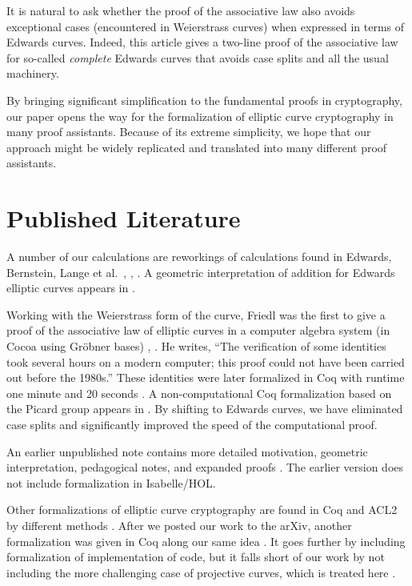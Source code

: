 \documentclass{llncs}
\begin{document}
It is natural to ask whether the proof of the associative law also
avoids exceptional cases (encountered in Weierstrass curves)
when expressed in terms of Edwards curves.
Indeed, this article gives a two-line proof of the associative law for
so-called \emph{complete} Edwards curves that avoids case splits and all
the usual machinery.

By bringing significant simplification to the fundamental proofs in
cryptography, our paper opens the way for the formalization of
elliptic curve cryptography in many proof assistants.  Because of its
extreme simplicity, we hope that our approach might be widely replicated
and translated into many different proof assistants.

\section{Published Literature}

A number of our calculations are reworkings of calculations found in
Edwards, Bernstein, Lange et al.~\cite{edwards2007normal},
\cite{bernstein2008twisted}, \cite{bernstein2007faster}.  A geometric
interpretation of addition for Edwards elliptic curves appears in
\cite{arene2011faster}.

Working with the Weierstrass form of the curve, Friedl was the first
to give a proof of the associative law of elliptic curves in a
computer algebra system (in Cocoa using Gr\"obner bases)
\cite{friedl}, \cite{friedl2017elementary}.  He writes, ``The
verification of some identities took several hours on a modern
computer; this proof could not have been carried out before the
1980s.''  These identities were later formalized in Coq with runtime one
minute and 20 seconds \cite{thery2007proving}.  A non-computational
Coq formalization based on the Picard group appears in
\cite{bartzia2014formal}.  By shifting to Edwards curves, we have
eliminated case splits and significantly improved the speed of the
computational proof.

An earlier unpublished note contains more detailed motivation,
geometric interpretation, pedagogical notes, and expanded proofs
\cite{hales2016group}.  The earlier version does not include
formalization in Isabelle/HOL.

Other formalizations of elliptic curve cryptography are found in Coq
and ACL2 by different methods \cite{russinoff2017computationally}.
After we posted our work to the arXiv, another formalization was given in Coq
along our same idea \cite{erbsen2017crafting}.  It goes further by including
formalization of implementation of code, 
but it falls short of our work by not including the more
challenging case of projective curves, which is treated here
\cite{erbsen2017systematic}.
\end{document}
